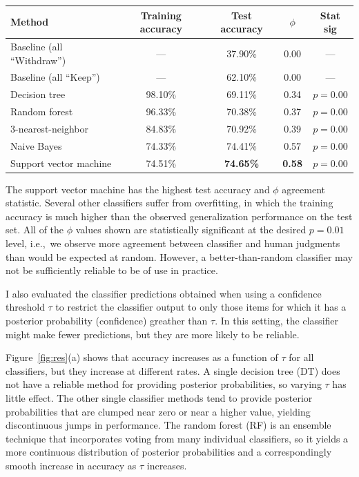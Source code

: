 \documentclass[man,11pt]{apa6}
\begin{document}
\singlespacing
\begin{center}
\begin{tabular}{|l|cc|cc|} \hline
Method & Training accuracy & Test accuracy & $\phi$ & Stat sig
\\ \hline
Baseline (all ``Withdraw'') & --- & 37.90\% & 0.00 & --- \\
Baseline (all ``Keep'') & --- & 62.10\% & 0.00 & --- \\ \hline
Decision tree          & 98.10\% & 69.11\% & 0.34 & $p=0.00$ \\
Random forest          & 96.33\% & 70.38\% & 0.37 & $p=0.00$ \\
3-nearest-neighbor     & 84.83\% & 70.92\% & 0.39 & $p=0.00$ \\
Naive Bayes            & 74.33\% & 74.41\% & 0.57 & $p=0.00$ \\
Support vector machine & 74.51\% & {\bf 74.65\%} & {\bf 0.58} & $p=0.00$ \\
\hline
\end{tabular}
\end{center}
\doublespacing

The support vector machine has the highest test accuracy and $\phi$
agreement statistic.  Several other classifiers suffer from
overfitting, in which the training accuracy is much higher than the
observed generalization performance on the test set.  All of the
$\phi$ values shown are statistically significant at the desired
$p=0.01$ level, i.e.,~we observe more agreement between classifier and
human judgments than would be expected at random.  However, a
better-than-random classifier may not be sufficiently reliable to be
of use in practice.

I also evaluated the classifier predictions obtained when using a
confidence threshold $\tau$ to restrict the classifier output to only
those items for which it has a posterior probability (confidence)
greather than $\tau$.  In this setting, the classifier might make
fewer predictions, but they are more likely to be reliable.

Figure~\ref{fig:res}(a) shows that accuracy increases as a function of
$\tau$ for all classifiers, but they increase at different rates.  A
single decision tree (DT) does not have a reliable method for
providing posterior probabilities, so varying $\tau$ has little
effect.  The other single classifier methods tend to provide posterior
probabilities that are clumped near zero or near a higher value,
yielding discontinuous jumps in performance.  The random forest (RF)
is an ensemble technique that incorporates voting from many individual
classifiers, so it yields a more continuous distribution of posterior
probabilities and a correspondingly smooth increase in accuracy as
$\tau$ increases.  
\end{document}
